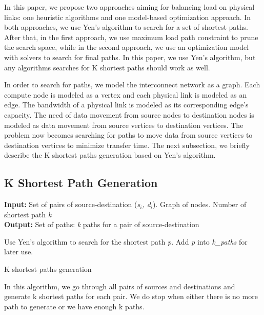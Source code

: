 
In this paper, we propose two approaches aiming for balancing load on physical links: one heuristic algorithms and one model-based optimization approach. In both approaches, we use Yen's algorithm \cite{Yen:Kpath} to search for a set of shortest paths. After that, in the first approach, we use maximum load path constraint to prune the search space, while in the second approach, we use an optimization model with solvers to search for final paths. In this paper, we use Yen's algorithm, but any algorithms searches for K shortest paths should work as well.

In order to search for paths, we model the interconnect network as a graph. Each compute node is modeled as a vertex and each physical link is modeled as an edge. The bandwidth of a physical link is modeled as its corresponding edge's capacity. The need of data movement from source nodes to destination nodes is modeled as data movement from source vertices to destination vertices. The problem now becomes searching for paths to move data from source vertices to destination vertices to minimize transfer time. The next subsection, we briefly describe the K shortest paths generation based on Yen's algorithm.

\subsection*{K Shortest Path Generation}

\begin{algorithm}[!htbp]
\textbf{Input:} Set of pairs of source-destination (\textit{s$_i$, d$_i$}). Graph of nodes. Number of shortest path \textit{k}\\
\textbf{Output:} Set of paths: \textit{k} paths for a pair of source-destination\\
\begin{algorithmic}
	\State Use Yen's algorithm to search for the shortest path \textit{p}.
        \State Add \textit{p} into \textit{k\_paths} for later use.
    \EndWhile
\EndFor
\end{algorithmic}

\caption{K shortest paths generation}
\label{alg:h1}

\end{algorithm}

In this algorithm, we go through all pairs of sources and destinations and generate k shortest paths for each pair. We do stop when either there is no more path to generate or we have enough k paths.

